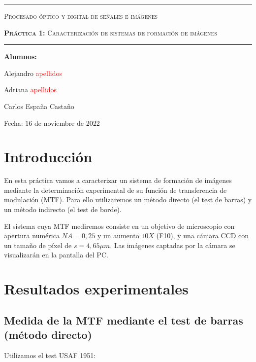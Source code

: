 \documentclass[12pt,a5paper]{article}
\begin{document}
\begin{titlepage}
\centering
\rule{16 cm}{2 pt}
{\scshape\Huge Procesado óptico y digital de señales e imágenes \par}
\vspace{2cm}
{\scshape\Large \textbf{Práctica 1:} Caracterización de sistemas de formación de imágenes\par}
\rule{16 cm}{2 pt}
\vfill
{\Large \textbf{Alumnos:}\par Alejandro \textcolor{red}{apellidos} \par Adriana \textcolor{red}{apellidos} \par Carlos España Castaño \par}
{\Large Fecha: 16 de noviembre de 2022 \par}
\end{titlepage}



\tableofcontents



\section{Introducción}
En esta práctica vamos a caracterizar un sistema de formación de imágenes mediante la determinación experimental de su función de transferencia de modulación (MTF). Para ello utilizaremos un método directo (el test de barras) y un método indirecto (el test de borde). \par

El sistema cuya MTF mediremos consiste en un objetivo de microscopio con apertura numérica $NA = 0,25$ y un aumento $10X$ (F10), y una cámara CCD con un tamaño de píxel de $s=4,65 \mu m$. Las imágenes captadas por la cámara se visualizarán en la pantalla del PC.




\section{Resultados experimentales}


\subsection{Medida de la MTF mediante el test de barras (método directo)}

Utilizamos el test USAF 1951:
\end{document}
